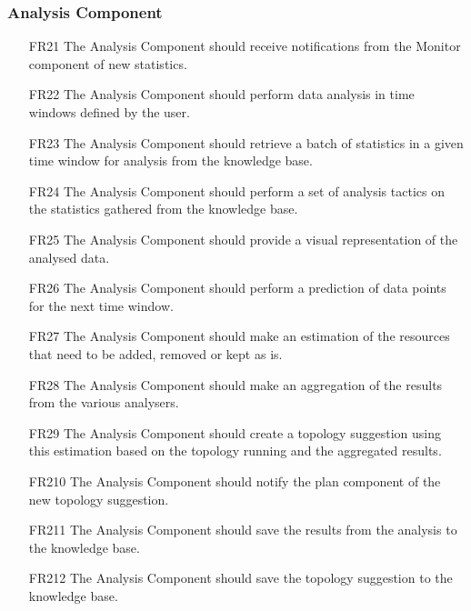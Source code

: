 \subsubsection{\textbf{Analysis Component}}
\begin{itemize}
    \item [FR21] The Analysis Component should receive notifications from the Monitor component of new statistics.
    \item [FR22] The Analysis Component should perform data analysis in time windows defined by the user.
    \item [FR23] The Analysis Component should retrieve a batch of statistics in a given time window for analysis from the knowledge base.
    \item [FR24] The Analysis Component should perform a set of analysis tactics on the statistics gathered from the knowledge base.
    \item [FR25] The Analysis Component should provide a visual representation of the analysed data.
    \item [FR26] The Analysis Component should perform a prediction of data points for the next time window.
    \item [FR27] The Analysis Component should make an estimation of the resources that need to be added, removed or kept as is.
    \item [FR28] The Analysis Component should make an aggregation of the results from the various analysers.
    \item [FR29] The Analysis Component should create a topology suggestion using this estimation based on the topology running and the aggregated results.
    \item [FR210] The Analysis Component should notify the plan component of the new topology suggestion.
    \item [FR211] The Analysis Component should save the results from the analysis to the knowledge base.
    \item [FR212] The Analysis Component should save the topology suggestion to the knowledge base.
\end{itemize}

